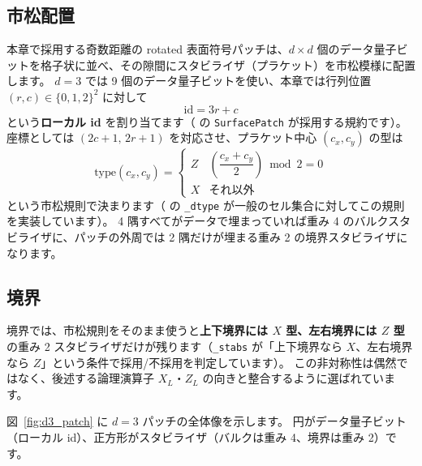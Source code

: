 \subsection{市松配置}

本章で採用する奇数距離の rotated 表面符号パッチは、$d\times d$ 個のデータ量子ビットを格子状に並べ、その隙間にスタビライザ（プラケット）を市松模様に配置します\cite{fowler2012surface}。
$d=3$ では 9 個のデータ量子ビットを使い、本章では行列位置 $(r,c)\in\{0,1,2\}^2$ に対して
\begin{equation}
  \mathrm{id} = 3r + c
\end{equation}
という\textbf{ローカル id} を割り当てます（ の \texttt{SurfacePatch} が採用する規約です）。
座標としては $(2c+1,\,2r+1)$ を対応させ、プラケット中心 $(c_x,c_y)$ の型は
\begin{equation}
  \mathrm{type}(c_x,c_y) = \begin{cases} Z & \left(\dfrac{c_x+c_y}{2}\right) \bmod 2 = 0\\ X & \text{それ以外} \end{cases}
\end{equation}
という市松規則で決まります（ の \texttt{\_dtype} が一般のセル集合に対してこの規則を実装しています）。
4 隅すべてがデータで埋まっていれば重み 4 のバルクスタビライザに、パッチの外周では 2 隅だけが埋まる重み 2 の境界スタビライザになります。

\subsection{境界}

境界では、市松規則をそのまま使うと\textbf{上下境界には $X$ 型、左右境界には $Z$ 型}の重み 2 スタビライザだけが残ります（\texttt{\_stabs} が「上下境界なら $X$、左右境界なら $Z$」という条件で採用/不採用を判定しています）。
この非対称性は偶然ではなく、後述する論理演算子 $X_L$・$Z_L$ の向きと整合するように選ばれています。

図~\ref{fig:d3_patch} に $d=3$ パッチの全体像を示します。
円がデータ量子ビット（ローカル id）、正方形がスタビライザ（バルクは重み 4、境界は重み 2）です。

